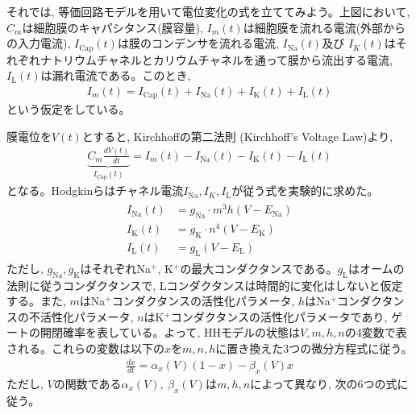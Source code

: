 \documentclass[letterpaper,10pt,english]{sphinxmanual}
\begin{document}
それでは, 等価回路モデルを用いて電位変化の式を立ててみよう。上図において, \(C_m\)は細胞膜のキャパシタンス(膜容量), \(I_{m}(t)\)は細胞膜を流れる電流(外部からの入力電流), \(I_\text{Cap}(t)\)は膜のコンデンサを流れる電流, \(I_\text{Na}(t)\)及び \(I_K(t)\)はそれぞれナトリウムチャネルとカリウムチャネルを通って膜から流出する電流, \(I_\text{L}(t)\)は漏れ電流である。このとき,
\begin{equation*}
\begin{split}
I_{m}(t)=I_\text{Cap}(t)+I_\text{Na}(t)+I_\text{K}(t)+I_\text{L}(t)    
\end{split}
\end{equation*}
という仮定をしている。

膜電位を\(V(t)\)とすると, Kirchhoffの第二法則 (Kirchhoff’s Voltage Law)より,
\begin{equation*}
\begin{split}
\underbrace{C_m\frac {dV(t)}{dt}}_{I_\text{Cap} (t)}=I_{m}(t)-I_\text{Na}(t)-I_\text{K}(t)-I_\text{L}(t)
\end{split}
\end{equation*}
となる。Hodgkinらはチャネル電流\(I_\text{Na}, I_K, I_\text{L}\)が従う式を実験的に求めた。
\begin{equation*}
\begin{split}
\begin{aligned}
I_\text{Na}(t) &= g_{\text{Na}}\cdot m^{3}h(V-E_{\text{Na}})\\
I_\text{K}(t) &= g_{\text{K}}\cdot n^{4}(V-E_{\text{K}})\\
I_\text{L}(t) &= g_{\text{L}}(V-E_{\text{L}})
\end{aligned}
\end{split}
\end{equation*}
ただし, \(g_{\text{Na}}, g_{\text{K}}\)はそれぞれNa\(^+\), K\(^+\)の最大コンダクタンスである。\(g_{\text{L}}\)はオームの法則に従うコンダクタンスで, Lコンダクタンスは時間的に変化はしないと仮定する。また, \(m\)はNa\(^+\)コンダクタンスの活性化パラメータ, \(h\)はNa\(^+\)コンダクタンスの不活性化パラメータ, \(n\)はK\(^+\)コンダクタンスの活性化パラメータであり, ゲートの開閉確率を表している。よって, HHモデルの状態は\(V, m, h, n\)の4変数で表される。これらの変数は以下の\(x\)を\(m, n, h\)に置き換えた3つの微分方程式に従う。
\begin{equation*}
\begin{split}
\frac{dx}{dt}=\alpha_{x}(V)(1-x)-\beta_{x}(V)x
\end{split}
\end{equation*}
ただし, \(V\)の関数である\(\alpha_{x}(V),\ \beta_{x}(V)\)は\(m, h, n\)によって異なり, 次の6つの式に従う。
\end{document}
